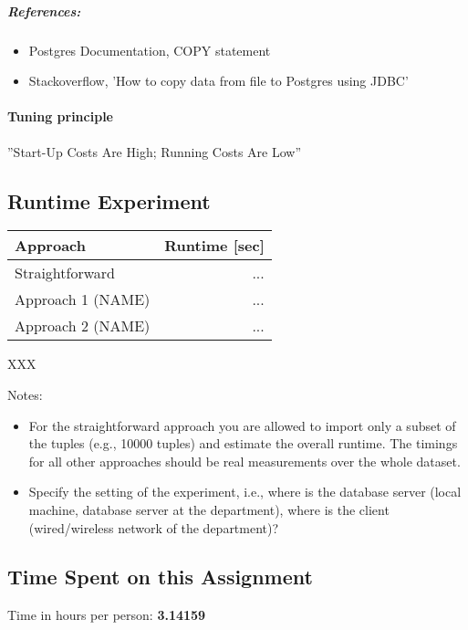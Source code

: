 \documentclass[11pt]{scrartcl}
\begin{document}
  
  \subparagraph{References:}
  
  \begin{itemize}
  
  \item{Postgres Documentation, COPY statement}
  
  
  \item{Stackoverflow, 'How to copy data from file to Postgres using JDBC'}
  
  
  \end{itemize}

  \paragraph{Tuning principle}
  
  ''Start-Up Costs Are High; Running Costs Are Low''

  \subsection*{Runtime Experiment}

  \begin{table}[H]
  \begin{tabular}{l|r}
    Approach & Runtime [sec] \\
    \hline
    Straightforward & ... \\
    Approach 1 (NAME) & ... \\
    Approach 2 (NAME) & ...     
  \end{tabular}
  \end{table}XXX

  \bigskip

  \noindent Notes:
  \begin{itemize}
  \item For the straightforward approach you are allowed to import
    only a subset of the tuples (e.g., 10000 tuples) and estimate the
    overall runtime. The timings for all other approaches should be
    real measurements over the whole dataset.
  \item Specify the setting of the experiment, i.e., where is the
    database server (local machine, database server at the
    department), where is the client (wired/wireless network of the
    department)?
\end{itemize}

  \subsection*{Time Spent on this Assignment}

  Time in hours per person: {\bf 3.14159}
\end{document}
